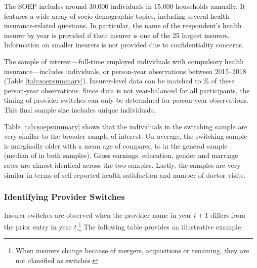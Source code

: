 \documentclass[a4paper, 11pt, english]{article}
\begin{document}
The SOEP includes around 30,000 individuals in 15,000 households annually. It features a wide array of socio-demographic topics, including several health insurance-related questions. In particular, the name of the respondent's health insurer by year is provided if their insurer is one of the 25 largest insurers. Information on smaller insurers is not provided due to confidentiality concerns.

The sample of interest---full-time employed individuals with compulsory health insurance---includes \SampleSoepFullUnique{} individuals, or \SampleSoepFullObs{} person-year observations between 2015--2018 (Table \ref{tab:soepsummary}). Insurer-level data can be matched to \SampleSoepHIMatch{}\% of these person-year observations. Since data is not year-balanced for all participants, the timing of provider switches can only be determined for \SampleSoepInfoObs{} person-year observations. This final sample size includes \SampleSoepInfoUnique{} unique individuals.

Table \ref{tab:soepsummary} shows that the individuals in the switching sample are very similar to the broader sample of interest. On average, the switching sample is marginally older with a mean age of \SoepSwitchingAgeMean{} compared to \SoepFullAgeMean{} in the general sample (median of \SoepSwitchingAgeMedian{} in both samples). Gross earnings, education, gender and marriage rates are almost identical across the two samples. Lastly, the samples are very similar in terms of self-reported health satisfaction and number of doctor visits.

\subsubsection*{Identifying Provider Switches \label{subsubsec:identifyingswitches}}

Insurer switches are observed when the provider name in year $t+1$ differs from the prior entry in year $t$.\footnote{When insurers change because of mergers, acquisitions or renaming, they are not classified as switches.} The following table provides an illustrative example.
\end{document}
